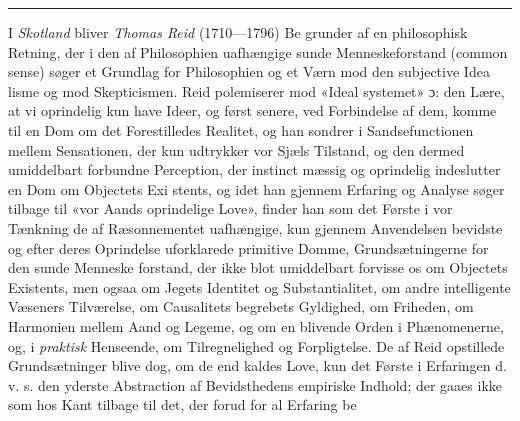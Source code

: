 \documentclass[12pt,a4paper]{book}
\newcommand{\divrule}{\begin{center}\rule{2cm}{0.4pt}\end{center}}
\begin{document}
\divrule

I \emph{Skotland} bliver \emph{Thomas Reid} (1710---1796) Be\-%
grunder af en philosophisk Retning, der i den af Philosophien
uafhængige sunde Menneskeforstand (common sense) søger et
Grundlag for Philosophien og et Værn mod den subjective Idea\-%
lisme og mod Skepticismen. Reid polemiserer mod «Ideal\-%
systemet» ɔ: den Lære, at vi oprindelig kun have Ideer, og
først senere, ved Forbindelse af dem, komme til en Dom om
det Forestilledes Realitet, og han sondrer i Sandsefunctionen
mellem Sensationen, der kun udtrykker vor Sjæls Tilstand, og
den dermed umiddelbart forbundne Perception, der instinct\-%
mæssig og oprindelig indeslutter en Dom om Objectets Exi\-%
stents, og idet han gjennem Erfaring og Analyse søger tilbage
til «vor Aands oprindelige Love», finder han som det Første
i vor Tænkning de af Ræsonnementet uafhængige, kun gjennem
Anvendelsen bevidste og efter deres Oprindelse uforklarede
primitive Domme, Grundsætningerne for den sunde Menneske\-%
forstand, der ikke blot umiddelbart forvisse os om Objectets
Existents, men ogsaa om Jegets Identitet og Substantialitet,
om andre intelligente Væseners Tilværelse, om Causalitets\-%
begrebets Gyldighed, om Friheden, om Harmonien mellem
Aand og Legeme, og om en blivende Orden i Phænomenerne,
og, i \emph{praktisk} Henseende, om Tilregnelighed og Forpligtelse.
De af Reid opstillede Grundsætninger blive dog, om de end
kaldes Love, kun det Første i Erfaringen d. v. s. den yderste
Abstraction af Bevidsthedens empiriske Indhold; der gaaes ikke
som hos Kant tilbage til det, der forud for al Erfaring be\-%
\end{document}
